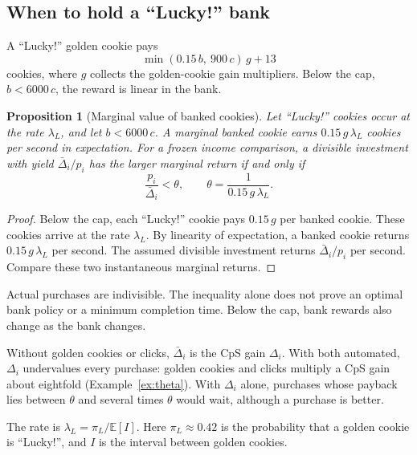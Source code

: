 \documentclass[11pt,a4paper]{article}
\numberwithin{equation}{section}
\newtheorem{proposition}[theorem]{Proposition}
\theoremstyle{definition}
\theoremstyle{remark}
\newcommand{\E}{\mathbb E}
\newcommand{\Lucky}{\textup{``Lucky!''}}
\begin{document}
\subsection{When to hold a \texorpdfstring{\Lucky{}}{Lucky!} bank}\label{sec:bank}
A \Lucky{} golden cookie pays
\begin{equation}\label{eq:lucky}
 \min(0.15\,b,\ 900\,c)\,g+13
\end{equation}
cookies, where $g$ collects the golden-cookie gain multipliers. Below the cap, $b<6000\,c$, the reward is linear in the bank.

\begin{proposition}[Marginal value of banked cookies]\label{prop:bank}
Let \Lucky{} cookies occur at the rate $\lambda_L$, and let $b<6000\,c$. A marginal banked cookie earns $0.15\,g\,\lambda_L$ cookies per second in expectation. For a frozen income comparison, a divisible investment with yield $\bar\Delta_i/p_i$ has the larger marginal return if and only if
\begin{equation}\label{eq:theta}
 \frac{p_i}{\bar\Delta_i}<\theta,\qquad\theta=\frac1{0.15\,g\,\lambda_L}.
\end{equation}
\end{proposition}

\begin{proof}
Below the cap, each \Lucky{} cookie pays $0.15\,g$ per banked cookie. These cookies arrive at the rate $\lambda_L$. By linearity of expectation, a banked cookie returns $0.15\,g\,\lambda_L$ per second. The assumed divisible investment returns $\bar\Delta_i/p_i$ per second. Compare these two instantaneous marginal returns.
\end{proof}

Actual purchases are indivisible. The inequality alone does not prove an optimal bank policy or a minimum completion time. Below the cap, bank rewards also change as the bank changes.

Without golden cookies or clicks, $\bar\Delta_i$ is the CpS gain $\Delta_i$. With both automated, $\Delta_i$ undervalues every purchase: golden cookies and clicks multiply a CpS gain about eightfold (Example~\ref{ex:theta}). With $\Delta_i$ alone, purchases whose payback lies between $\theta$ and several times $\theta$ would wait, although a purchase is better.

The rate is $\lambda_L=\pi_L/\E[I]$. Here $\pi_L\approx0.42$ is the probability that a golden cookie is \Lucky{}, and $I$ is the interval between golden cookies.
\end{document}
